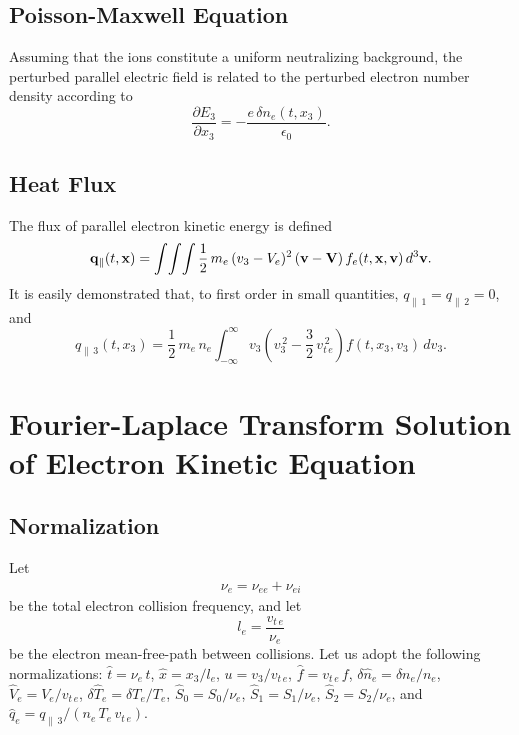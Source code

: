 \documentclass[12pt,prb,aps]{revtex4-1}
\begin{document}
\subsection{Poisson-Maxwell Equation}
Assuming that the ions constitute a uniform neutralizing background, the perturbed parallel electric field is related to the perturbed electron number
density according to
\begin{equation}\label{pois}
\frac{\partial  E_3}{\partial x_3}=-\frac{e\,\delta n_e(t,x_3)}{\epsilon_0}.
\end{equation}

\subsection{Heat Flux}
The flux of parallel electron kinetic energy is defined\,\cite{rf0}
\begin{equation}
{\bf q}_\parallel(t,{\bf x}) =  \int\!\int\!\int \frac{1}{2}\,m_e\,(v_3-V_e)^2\,({\bf v}-{\bf V})\,f_e(t,{\bf x},{\bf v})\,d^3{\bf v}.
\end{equation}
It is easily demonstrated that, to first order in small quantities, $q_{\parallel\,1}=q_{\parallel\,2}=0$, and
\begin{equation}\label{q3}
q_{\parallel\,3}(t,x_3) = \frac{1}{2}\,m_e\,n_e\int_{-\infty}^\infty v_3\left(v_3^{\,2}
-\frac{3}{2}\,v_{t\,e}^{\,2}\right)f(t,x_3,v_3)\,dv_3.
\end{equation}

\section{Fourier-Laplace Transform Solution of Electron Kinetic Equation}\label{s3}
\subsection{Normalization}
Let
\begin{align}
\nu_e= \nu_{ee}+\nu_{ei}
\end{align}
be the total electron collision frequency, and
let
\begin{equation}
l_e= \frac{v_{t\,e}}{\nu_e}
\end{equation}
be the electron mean-free-path between collisions. 
Let us adopt the following normalizations: 
$\hat{t} = \nu_{e}\,t$,
$\hat{x}= x_3/l_e$,
$u = v_3/v_{t\,e}$,
$\hat{f}= v_{t\,e}\,f$,
$\delta\hat{n}_e= \delta n_e/n_e$,
$\hat{V}_e= V_e/v_{t\,e}$,
$\delta\hat{T}_e= \delta T_e/T_e$,
$\hat{S}_0 = S_0/\nu_{e}$,
$\hat{S}_1 = S_1/\nu_{e}$,
$\hat{S}_2= S_2/\nu_{e}$, and
$\hat{q}_e=q_{\parallel\,3}/(n_e\,T_e\,v_{t\,e})$.
 
\end{document}
